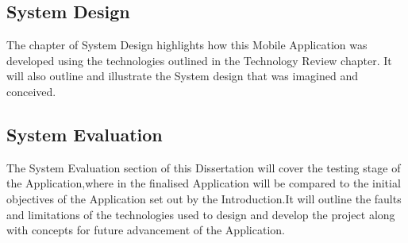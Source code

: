 \subsection{System Design}
The chapter of System Design highlights how this Mobile Application was developed using the technologies outlined in the Technology Review chapter. It will also outline and illustrate the System design that was imagined and conceived.
\subsection{System Evaluation}
The System Evaluation section of this Dissertation will cover the testing stage of the Application,where in the finalised Application will be compared to the initial objectives of the Application set out by the Introduction.It will outline the faults and limitations of the technologies used to design and develop the project along with concepts for future advancement of the Application.

